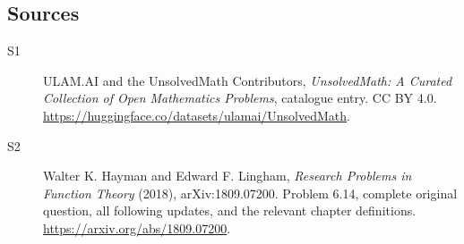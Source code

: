 \documentclass[11pt]{book}
\begin{document}
\subsection{Sources}
\begin{description}
\item[\hypertarget{source:statement:1}{S1}] ULAM.AI and the UnsolvedMath Contributors, \emph{UnsolvedMath: A Curated Collection of Open Mathematics Problems}, catalogue entry. CC BY 4.0. \url{https://huggingface.co/datasets/ulamai/UnsolvedMath}.
\item[\hypertarget{source:statement:2}{S2}] Walter K. Hayman and Edward F. Lingham, \emph{Research Problems in Function Theory} (2018), arXiv:1809.07200. Problem 6.14, complete original question, all following updates, and the relevant chapter definitions. \url{https://arxiv.org/abs/1809.07200}.
\end{description}
\label{end:statement}
\end{document}
